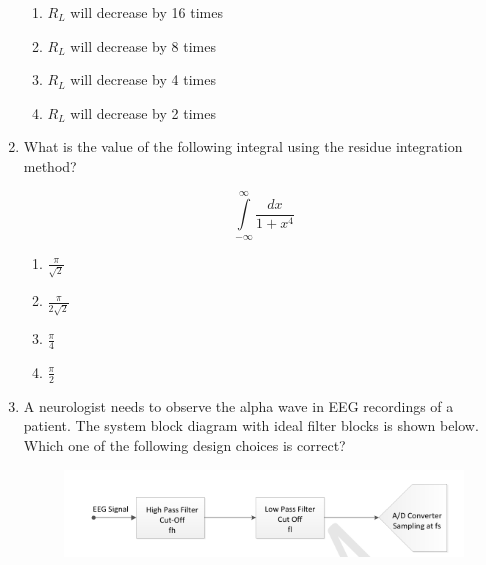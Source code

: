 \documentclass[a4paper,12pt]{exam}
\numberwithin{equation}{enumi}
\numberwithin{figure}{enumi}
\begin{document}
\begin{enumerate}
\hfill{}

\begin{enumerate}
\item $R_L$  will decrease by 16 times
\item $R_L$  will decrease by 8 times
\item $R_L$  will decrease by 4 times
\item $R_L$  will decrease by 2 times
\end{enumerate}  

\item What is the value of the following integral using the residue integration method?

\begin{equation*}
\displaystyle\int\limits_{-\infty}^\infty\frac{dx}{1 + x^4}
\end{equation*}

\hfill{}

\begin{multicols}{4}
\begin{enumerate}
\item $\displaystyle\frac{\pi}{\sqrt{2}}$
\vspace{0.25cm}
\item $\displaystyle\frac{\pi}{2\sqrt{2}}$
\vspace{0.25cm}
\item $\displaystyle\frac{\pi}{4}$
\vspace{0.25cm}
\item $\displaystyle\frac{\pi}{2}$
\vspace{0.25cm}
\end{enumerate} 
\end{multicols}

\item A neurologist needs to observe the alpha wave in EEG recordings of a patient. The  system block diagram with ideal filter blocks is shown below. Which one of the following design choices is correct?

\begin{figure}[H]
\centering
\includegraphics[width=0.8\columnwidth]{figs/Q45.png}
\label{fig:Q45.png}
\end{figure}


\end{enumerate}
\end{document}
